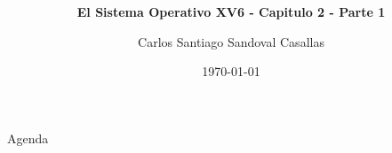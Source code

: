 \documentclass{libs/ufc_format}
\title[Sistemas Operativos]{\huge\textbf{}}
\subtitle{\textbf{El Sistema Operativo XV6 - Capitulo 2 - Parte 1}}
\author{Carlos Santiago Sandoval Casallas}
\institute[UNAL]{
  \normalsize{\email{csandovalc@unal.edu.co}}
  \newline
  \department{Departamento de Ingeniería de Sistemas e Industrial}
  \newline
  \ufc
}
\date{\today}
\begin{document}


\begin{frame}
  \maketitle
\end{frame}

\begin{frame}{Agenda}
  \tableofcontents
\end{frame}
\end{document}
